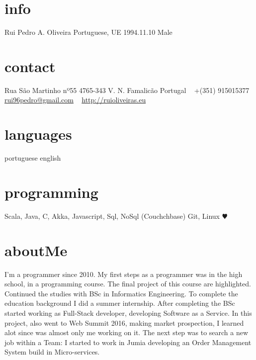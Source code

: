 \documentclass[]{friggeri-cv} %
\begin{document}


\begin{aside} %
\section{info}
Rui Pedro A. Oliveira
Portuguese, UE
1994.11.10
Male
\section{contact}
Rua São Martinho nº55
4765-343 V. N. Famalicão
Portugal
~
+(351) 915015377
~
\href{mailto:rui96pedro@gmail.com}{rui96pedro@gmail.com}
~
\href{http://ruioliveiras.eu}{http://ruioliveiras.eu}
~
\section{languages}
portuguese
english
\section{programming}
Scala, Java, C,
Akka,
Javascript,
Sql, NoSql (Couchchbase)
Git, Linux {\color{red} $\varheartsuit$}
~
\end{aside}

\section{aboutMe}
I'm a programmer since 2010.
My first steps as a programmer was in the high school, in a programming course. The final project of this course are highlighted.
Continued the studies with BSc in Informatics Engineering.
To complete the education background I did a summer internship.
After completing the BSc started working as Full-Stack developer, developing Software as a Service.
In this project, also went to Web Summit 2016, making market prospection, I learned alot since was almost only me working on it.
The next step was to search a new job within a Team: I started to work in Jumia developing an Order Management System build in Micro-services.
\end{document}
